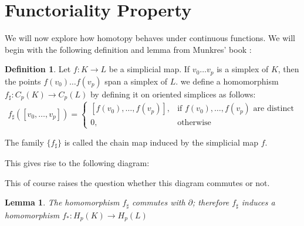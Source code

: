 \documentclass[toc=bib, headinclude]{scrartcl}
\theoremstyle{plain}
\newtheorem{lemma}[theorem]{Lemma}
\theoremstyle{definition}
\newtheorem	{definition}[theorem]{Definition}
\theoremstyle{remark}
\begin{document}
\section{Functoriality Property}
We will now explore how homotopy behaves under continuous functions. We will begin with the following definition and lemma from Munkres' book \cite[lemma 12.1, p. 62]{mu}:

\begin{definition}
	Let $f: K\to L$ be a simplicial map. If $v_0\dots v_p$ is a simplex of $K$, then the points $f(v_0)\dots f(v_p)$ span a simplex of $L$. we define a homomorphism $f_\sharp: C_p(K)\to C_p(L)$ by defining it on oriented simplices as follows:
	\[
	f_\sharp([v_0,\dots,v_p])=\begin{cases}
	[f(v_0),\dots, f(v_p)],& \text{if } f(v_0),\dots, f(v_p) \text{ are distinct}\\
	0,&\text{otherwise}
	\end{cases}
	\]
	
	The family $\{f_\sharp\}$ is called the chain map induced by the simplicial map $f$.
\end{definition}

This gives rise to the following diagram:

\begin{center}
	
\end{center}

This of course raises the question whether this diagram commutes or not. 
\begin{lemma}
	The homomorphism $f_\sharp$ commutes with $\partial$; therefore $f_\sharp$ induces a homomorphism $f_\ast:H_p(K)\to H_p(L)$
\end{lemma}
\end{document}
